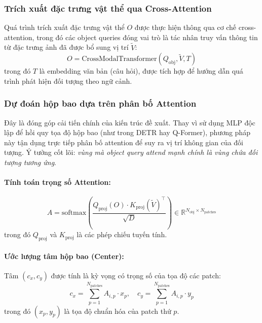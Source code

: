 \subsubsection{Trích xuất đặc trưng vật thể qua Cross-Attention}

Quá trình trích xuất đặc trưng vật thể \(O\) được thực hiện thông qua cơ chế cross-attention, trong đó các object queries đóng vai trò là tác nhân truy vấn thông tin từ đặc trưng ảnh đã được bổ sung vị trí \(\tilde{V}\):
\begin{equation}
    O = \text{CrossModalTransformer}(Q_{\text{obj}}, \tilde{V}, T)
\end{equation}
trong đó \(T\) là embedding văn bản (câu hỏi), được tích hợp để hướng dẫn quá trình phát hiện đối tượng theo ngữ cảnh.

\subsubsection{Dự đoán hộp bao dựa trên phân bố Attention}

Đây là đóng góp cải tiến chính của kiến trúc đề xuất. Thay vì sử dụng MLP độc lập để hồi quy tọa độ hộp bao (như trong DETR hay Q-Former), phương pháp này tận dụng trực tiếp phân bố attention để suy ra vị trí không gian của đối tượng. Ý tưởng cốt lõi: \textit{vùng mà object query attend mạnh chính là vùng chứa đối tượng tương ứng}.

\paragraph{Tính toán trọng số Attention:}
\begin{equation}
    A = \text{softmax}\left(\frac{Q_{\text{proj}}(O) \cdot K_{\text{proj}}(\tilde{V})^\top}{\sqrt{D}}\right) \in \mathbb{R}^{N_{\text{obj}} \times N_{\text{patches}}}
\end{equation}
trong đó \(Q_{\text{proj}}\) và \(K_{\text{proj}}\) là các phép chiếu tuyến tính.

\paragraph{Ước lượng tâm hộp bao (Center):}
Tâm \((c_x, c_y)\) được tính là kỳ vọng có trọng số của tọa độ các patch:
\begin{equation}
    c_x = \sum_{p=1}^{N_{\text{patches}}} A_{i,p} \cdot x_p, \quad c_y = \sum_{p=1}^{N_{\text{patches}}} A_{i,p} \cdot y_p
\end{equation}
trong đó \((x_p, y_p)\) là tọa độ chuẩn hóa của patch thứ \(p\).

